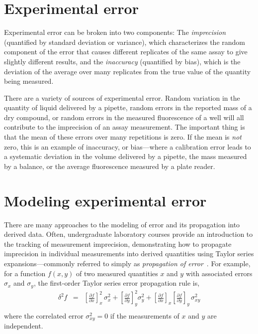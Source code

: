 \documentclass[aps,pre,twocolumn,nofootinbib,superscriptaddress,linenumbers]{revtex4-1}
\begin{document}
\section{Experimental error}

Experimental error can be broken into two components: The \emph{imprecision} (quantified by standard deviation or variance), which characterizes the random component of the error that causes different replicates of the same assay to give slightly different results, and the \emph{inaccuracy} (quantified by bias), which is the deviation of the average over many replicates from the true value of the quantity being measured.

There are a variety of sources of experimental error. 
Random variation in the quantity of liquid delivered by a pipette, random errors in the reported mass of a dry compound, or random errors in the measured fluorescence of a well will all contribute to the imprecision of an assay measurement.
The important thing is that the mean of these errors over many repetitions is zero. 
If the mean is \emph{not} zero, this is an example of inaccuracy, or bias---where a calibration error leads to a systematic deviation in the volume delivered by a pipette, the mass measured by a balance, or the average fluorescence measured by a plate reader.

\section*{Modeling experimental error}

There are many approaches to the modeling of error and its propagation into derived data.
Often, undergraduate laboratory courses provide an introduction to the tracking of measurement imprecision, demonstrating how to propagate imprecision in individual measurements into derived quantities using Taylor series expansions---commonly referred to simply as \emph{propagation of error}~\cite{taylor_introduction_1997}.
For example, for a function $f(x,y)$ of two measured quantities $x$ and $y$ with associated errors $\sigma_x$ and $\sigma_y$, the first-order Taylor series error propagation rule is,
\begin{eqnarray}
\delta^2 f &=& \left[\frac{\partial f}{\partial x}\right]^2_x \, \sigma^2_x + \left[\frac{\partial f}{\partial y}\right]^2_y \sigma^2_y + \left[\frac{\partial f}{\partial x}\right]_x \left[\frac{\partial f}{\partial y}\right]_y \, \sigma^2_{xy} \nonumber \\ \label{equation:error-propagation}
\end{eqnarray}
where the correlated error $\sigma^2_{xy} = 0$ if the measurements of $x$ and $y$ are independent.
\end{document}
